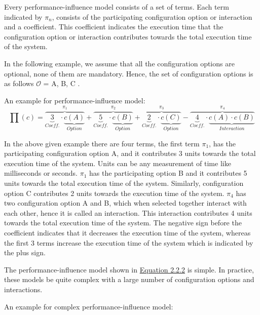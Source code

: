 Every performance-influence model consists of a set of terms. Each term indicated by $\pi_n$, consists of the participating configuration option or interaction and a coefficient. This coefficient indicates the execution time that the configuration option or interaction contributes towards the total execution time of the system.

\sloppy In the following example, we assume that all the configuration options are optional, none of them are mandatory. Hence, the set of configuration options is as follows $\mathcal{O}$ = \textbraceleft A, B, C \textbraceright. 


An example for performance-influence model:
\begin{equation*}
  \prod {(c)} = \overbrace{\underbrace {3}_{Coeff.} \cdot  \underbrace{{c(A)}}_{Option}}^{\pi_1}  + \overbrace{ \underbrace{5}_{Coeff.} \cdot \underbrace{{c(B)}}_{Option}}^{\pi_2} +  \overbrace{ \underbrace{2}_{Coeff.} \cdot \underbrace{{c(C)}}_{Option}}^{\pi_3} -  \overbrace{\underbrace{4}_{Coeff.} \cdot \underbrace{{ c(A)} \cdot {c(B)}}_{Interaction}}^{\pi_4}
  \tag{2.2.2}\label{eq:2.2.2}
\end{equation*}

In the above given example there are four terms, the first term $\pi_1$, has the participating configuration option A, and it contributes 3 units towards the total execution time of the system. Units can be any measurement of time like milliseconds or seconds. \texttt{$\pi_1$} has the participating option B and it contributes 5 units towards the total execution time of the system. Similarly, configuration option C contributes 2 units towards the execution time of the system. \texttt{$\pi_4$} has two configuration option A and B, which when selected together interact with each other, hence it is called an interaction. This interaction contributes 4 units towards the total execution time of the system. The negative sign before the coefficient indicates that it decreases the execution time of the system, whereas the first 3 terms increase the execution time of the system which is indicated by the plus sign.

The performance-influence model shown in \hyperref[eq:2.2.2]{Equation 2.2.2} is simple. In practice, these models be quite complex with a large number of configuration options and interactions. 

An example for complex performance-influence model:

